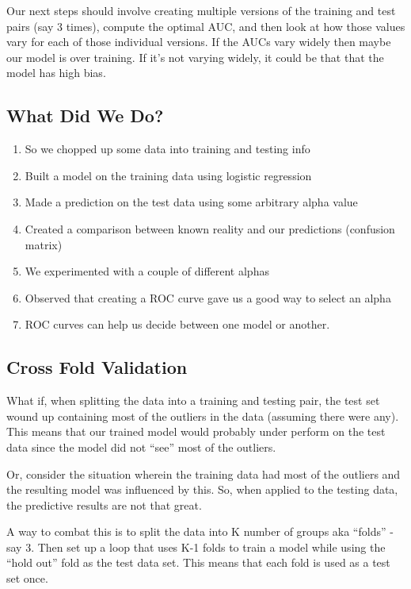 \documentclass[
]{article}
\providecommand{\tightlist}{%
  \setlength{\itemsep}{0pt}\setlength{\parskip}{0pt}}
\begin{document}
Our next steps should involve creating multiple versions of the training
and test pairs (say 3 times), compute the optimal AUC, and then look at
how those values vary for each of those individual versions. If the AUCs
vary widely then maybe our model is over training. If it's not varying
widely, it could be that that the model has high bias.

\hypertarget{what-did-we-do}{%
\subsection{What Did We Do?}\label{what-did-we-do}}

\begin{enumerate}
\def\labelenumi{\arabic{enumi})}
\tightlist
\item
  So we chopped up some data into training and testing info
\item
  Built a model on the training data using logistic regression
\item
  Made a prediction on the test data using some arbitrary alpha value
\item
  Created a comparison between known reality and our predictions
  (confusion matrix)
\item
  We experimented with a couple of different alphas
\item
  Observed that creating a ROC curve gave us a good way to select an
  alpha
\item
  ROC curves can help us decide between one model or another.
\end{enumerate}

\hypertarget{cross-fold-validation}{%
\subsection{Cross Fold Validation}\label{cross-fold-validation}}

What if, when splitting the data into a training and testing pair, the
test set wound up containing most of the outliers in the data (assuming
there were any). This means that our trained model would probably under
perform on the test data since the model did not ``see'' most of the
outliers.

Or, consider the situation wherein the training data had most of the
outliers and the resulting model was influenced by this. So, when
applied to the testing data, the predictive results are not that great.

A way to combat this is to split the data into K number of groups aka
``folds'' - say 3. Then set up a loop that uses K-1 folds to train a
model while using the ``hold out'' fold as the test data set. This means
that each fold is used as a test set once.
\end{document}
